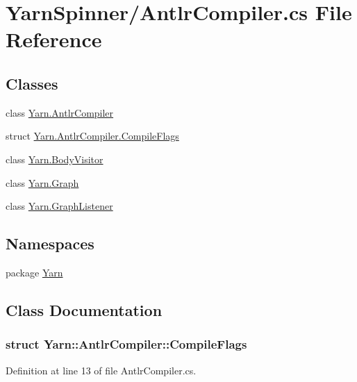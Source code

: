 \hypertarget{a00306}{\section{Yarn\-Spinner/\-Antlr\-Compiler.cs File Reference}
\label{a00306}
}
\subsection*{Classes}
\begin{DoxyCompactItemize}
\item 
class \hyperlink{a00040}{Yarn.\-Antlr\-Compiler}
\item 
struct \hyperlink{a00040_a00377}{Yarn.\-Antlr\-Compiler.\-Compile\-Flags}
\item 
class \hyperlink{a00046}{Yarn.\-Body\-Visitor}
\item 
class \hyperlink{a00110}{Yarn.\-Graph}
\item 
class \hyperlink{a00111}{Yarn.\-Graph\-Listener}
\end{DoxyCompactItemize}
\subsection*{Namespaces}
\begin{DoxyCompactItemize}
\item 
package \hyperlink{a00053}{Yarn}
\end{DoxyCompactItemize}


\subsection{Class Documentation}
\label{a00377}
\hypertarget{a00040_a00377}{}
\subsubsection{struct Yarn\-:\-:Antlr\-Compiler\-:\-:Compile\-Flags}


Definition at line 13 of file Antlr\-Compiler.\-cs.



